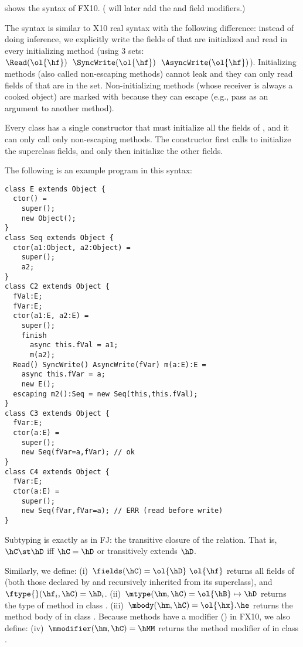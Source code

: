 \documentclass[a4paper]{article}
\begin{document}
 shows the syntax of FX10.
( will later add the \hval and \hvar field modifiers.)

The syntax is similar to X10 real syntax with the following difference:
    instead of doing inference, we explicitly write the fields of \this that are initialized and read in
    every initializing method
    (using 3 sets: $\Read(\ol{\hf})~~\SyncWrite(\ol{\hf})~~\AsyncWrite(\ol{\hf})$).
Initializing methods (also called non-escaping methods) cannot leak \this and they can only read fields of \this that are in the \Read set.
Non-initializing methods (whose receiver is always a cooked object) are marked with \hescaping
    because they can escape \this (e.g., pass \this as an argument to another method).

Every class has a single constructor that must initialize all the fields of \this,
    and it can only call only non-escaping methods.
The constructor first calls \super to initialize the superclass fields,
    and only then initialize the other fields.

The following is an example program in this syntax:

\begin{lstlisting}
class E extends Object {
  ctor() =
    super();
    new Object();
}
class Seq extends Object {
  ctor(a1:Object, a2:Object) =
    super();
    a2;
}
class C2 extends Object {
  fVal:E;
  fVar:E;
  ctor(a1:E, a2:E) =
    super();
    finish
      async this.fVal = a1;
      m(a2);
  Read() SyncWrite() AsyncWrite(fVar) m(a:E):E =
    async this.fVar = a;
    new E();
  escaping m2():Seq = new Seq(this,this.fVal);
}
class C3 extends Object {
  fVar:E;
  ctor(a:E) =
    super();
    new Seq(fVar=a,fVar); // ok
}
class C4 extends Object {
  fVar:E;
  ctor(a:E) =
    super();
    new Seq(fVar,fVar=a); // ERR (read before write)
}
\end{lstlisting}


{Subtyping} is exactly as in FJ:
    the transitive closure of the \hextends relation.
That is, $\hC \st \hD$ iff $\hC=\hD$ or \hC transitively extends $\hD$.

Similarly, we define:
(i)~$\fields(\hC)=\ol{\hD}~\ol{\hf}$ returns all fields of \hC (both those declared by \hC and recursively inherited from its superclass),
    and~$\ftype{}(\hf_i,\hC) =\hD_i$.
(ii)~$\mtype(\hm,\hC) = \ol{\hB}\mapsto\hD$ returns the type of method \hm in class \hC.
(iii)~$\mbody(\hm,\hC) = \ol{\hx}.\he$ returns the method body of \hm in class \hC.
Because methods have a modifier (\hMM) in FX10, we also define:
(iv)~$\mmodifier(\hm,\hC) = \hMM$ returns the method modifier of \hm in class \hC.
\end{document}
